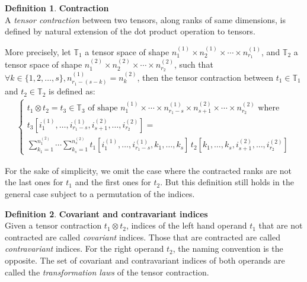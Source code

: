 \documentclass{article}
\theoremstyle{definition}
\newtheorem{definition}{Definition}[section]
\theoremstyle{remark}
\theoremstyle{plain}
\newcommand{\tspace}{\mathbb{T}}
\begin{document}
\begin{definition}\textbf{Contraction}\\
A \emph{tensor contraction} between two tensors, along ranks of same dimensions, is defined by natural extension of the dot product operation to tensors.

More precisely, let $\tspace_1$ a tensor space of shape $n_1^{(1)} \times n_2^{(1)} \times \cdots \times n_{r_1}^{(1)}$, and $\tspace_2$ a tensor space of shape $n_1^{(2)} \times n_2^{(2)} \times \cdots \times n_{r_2}^{(2)}$, such that $\forall k \in \{1, 2, \ldots, s\}, n_{r_1-(s-k)}^{(1)} = n_k^{(2)}$, then the tensor contraction between $t_1 \in \tspace_1$ and $t_2 \in \tspace_2$ is defined as:
\begin{gather*}
\left\{
  \begin{array}{l}
    t_1 \otimes t_2 = t_3 \in \tspace_3 \text{ of shape } n_1^{(1)} \times \cdots \times n_{r_1-s}^{(1)} \times n_{s+1}^{(2)} \times \cdots \times n_{r_2}^{(2)}
    \text{ where} \\
    t_3[i_1^{(1)}, \ldots, i_{r_1-s}^{(1)}, i_{s+1}^{(2)}, \ldots, i_{r_2}^{(2)}] = \\
    \displaystyle \sum_{k_1=1}^{n_1^{(2)}} \cdots \sum_{k_s=1}^{n_s^{(2)}}
    t_1[i_1^{(1)}, \ldots, i_{r_1-s}^{(1)}, k_1, \ldots, k_s] \hspace{2pt}
    t_2[k_1, \ldots, k_s, i_{s+1}^{(2)}, \ldots, i_{r_2}^{(2)}]
  \end{array}
\right.
\end{gather*}
\end{definition}

For the sake of simplicity, we omit the case where the contracted ranks are not the last ones for $t_1$ and the first ones for $t_2$. But this definition still holds in the general case subject to a permutation of the indices.

\begin{definition}\textbf{Covariant and contravariant indices}\\
Given a tensor contraction $t_1 \otimes t_2$, indices of the left hand operand $t_1$ that are not contracted are called \emph{covariant} indices. Those that are contracted are called \emph{contravariant} indices. For the right operand $t_2$, the naming convention is the opposite. 
The set of covariant and contravariant indices of both operands are called the \emph{transformation laws} of the tensor contraction.
\end{definition}
\end{document}
